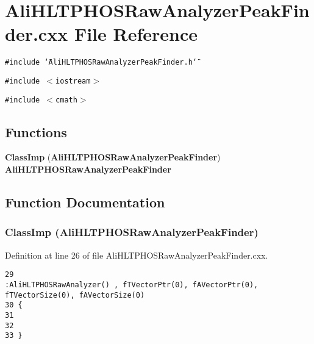 \section{Ali\-HLTPHOSRaw\-Analyzer\-Peak\-Finder.cxx File Reference}
\label{AliHLTPHOSRawAnalyzerPeakFinder_8cxx}


{\tt \#include \char`\"{}Ali\-HLTPHOSRaw\-Analyzer\-Peak\-Finder.h\char`\"{}}\par
{\tt \#include $<$iostream$>$}\par
{\tt \#include $<$cmath$>$}\par
\subsection*{Functions}
\begin{CompactItemize}
\item 
{\bf Class\-Imp} ({\bf Ali\-HLTPHOSRaw\-Analyzer\-Peak\-Finder}) {\bf Ali\-HLTPHOSRaw\-Analyzer\-Peak\-Finder}
\end{CompactItemize}


\subsection{Function Documentation}
\subsubsection{\setlength{\rightskip}{0pt plus 5cm}Class\-Imp ({\bf Ali\-HLTPHOSRaw\-Analyzer\-Peak\-Finder})}\label{AliHLTPHOSRawAnalyzerPeakFinder_8cxx_a0}




Definition at line 26 of file Ali\-HLTPHOSRaw\-Analyzer\-Peak\-Finder.cxx.

\footnotesize\begin{verbatim}29                                                                                                       :AliHLTPHOSRawAnalyzer() , fTVectorPtr(0), fAVectorPtr(0), fTVectorSize(0), fAVectorSize(0)
30 {
31 
32 
33 }
\end{verbatim}\normalsize 


